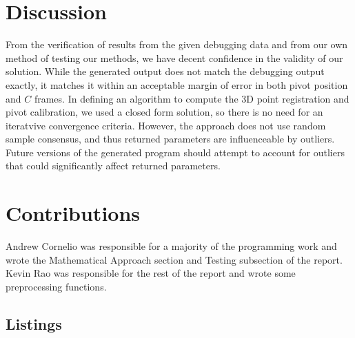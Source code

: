 \documentclass[12pt,letterpaper]{scrartcl}
\begin{document}
    \section{Discussion}
    From the verification of results from the given debugging data and from our own method of testing our methods, we have decent confidence in the validity of our solution.
    While the generated output does not match the debugging output exactly, it matches it within an acceptable margin of error in both pivot position and $C$ frames.
    In defining an algorithm to compute the 3D point registration and pivot calibration, we used a closed form solution, so there is no need for an iteratvive convergence criteria.
    However, the approach does not use random sample consensus, and thus returned parameters are influenceable by outliers.
    Future versions of the generated program should attempt to account for outliers that could significantly affect returned parameters.
    \section{Contributions}
    Andrew Cornelio was responsible for a majority of the programming work and wrote the Mathematical Approach section and Testing subsection of the report.
    Kevin Rao was responsible for the rest of the report and wrote some preprocessing functions.
	\printbibliography
	\begin{appendix}
	\section{Listings}
	
	
	
	
	
	
	
	
    
    
    
    \end{appendix}
\end{document}

